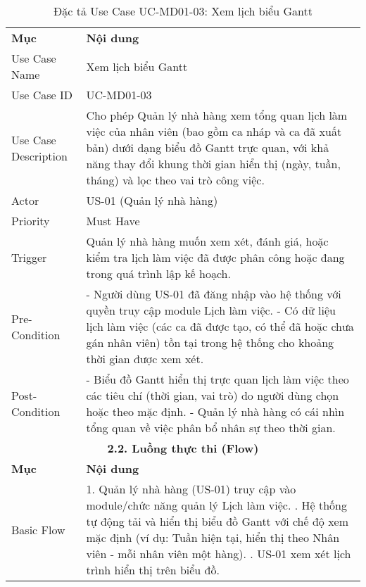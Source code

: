 \begin{longtable}{|m{4cm}|p{11cm}|}
\caption{Đặc tả Use Case UC-MD01-03: Xem lịch biểu Gantt} \label{tab:uc_md01_03} \\
\hline

\endhead %

\hline
\endfoot %

\hline
\endlastfoot %
\multicolumn{2}{|c|}{\textbf{2.1. Tóm tắt (Summary)}} \\
\hline
\textbf{Mục} & \textbf{Nội dung} \\
\hline
Use Case Name & Xem lịch biểu Gantt \\
\hline
Use Case ID & UC-MD01-03 \\
\hline
Use Case Description & Cho phép Quản lý nhà hàng xem tổng quan lịch làm việc của nhân viên (bao gồm ca nháp và ca đã xuất bản) dưới dạng biểu đồ Gantt trực quan, với khả năng thay đổi khung thời gian hiển thị (ngày, tuần, tháng) và lọc theo vai trò công việc. \\
\hline
Actor & US-01 (Quản lý nhà hàng) \\
\hline
Priority & Must Have \\
\hline
Trigger & Quản lý nhà hàng muốn xem xét, đánh giá, hoặc kiểm tra lịch làm việc đã được phân công hoặc đang trong quá trình lập kế hoạch. \\
\hline
Pre-Condition & - Người dùng US-01 đã đăng nhập vào hệ thống với quyền truy cập module Lịch làm việc. \newline - Có dữ liệu lịch làm việc (các ca đã được tạo, có thể đã hoặc chưa gán nhân viên) tồn tại trong hệ thống cho khoảng thời gian được xem xét. \\
\hline
Post-Condition & - Biểu đồ Gantt hiển thị trực quan lịch làm việc theo các tiêu chí (thời gian, vai trò) do người dùng chọn hoặc theo mặc định. \newline - Quản lý nhà hàng có cái nhìn tổng quan về việc phân bổ nhân sự theo thời gian. \\
\hline
\multicolumn{2}{|c|}{\textbf{2.2. Luồng thực thi (Flow)}} \\
\hline
\textbf{Mục} & \textbf{Nội dung} \\
\hline
Basic Flow & 1. Quản lý nhà hàng (US-01) truy cập vào module/chức năng quản lý Lịch làm việc. \newline 2. Hệ thống tự động tải và hiển thị biểu đồ Gantt với chế độ xem mặc định (ví dụ: Tuần hiện tại, hiển thị theo Nhân viên - mỗi nhân viên một hàng). \newline 3. US-01 xem xét lịch trình hiển thị trên biểu đồ. \\

\end{longtable}

